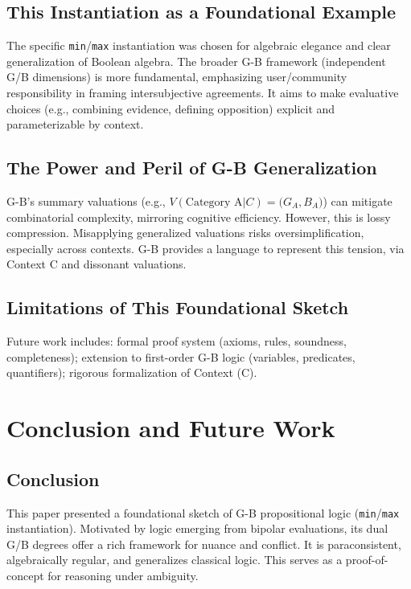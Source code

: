 \documentclass[11pt]{article}
\newcommand{\GB}[2]{\bigl(#1,#2\bigr)} %
\theoremstyle{remark}
\begin{document}
\subsection{This Instantiation as a Foundational Example}
The specific \texttt{min}/\texttt{max} instantiation was chosen for algebraic elegance and clear generalization of Boolean algebra. The broader G-B framework (independent G/B dimensions) is more fundamental, emphasizing user/community responsibility in framing intersubjective agreements. It aims to make evaluative choices (e.g., combining evidence, defining opposition) explicit and parameterizable by context.

\subsection{The Power and Peril of G-B Generalization}
G-B's summary valuations (e.g., $V(\text{Category A} | C) = \GB{G_A}{B_A}$) can mitigate combinatorial complexity, mirroring cognitive efficiency. However, this is lossy compression. Misapplying generalized valuations risks oversimplification, especially across contexts. G-B provides a language to represent this tension, via Context C and dissonant valuations.

\subsection{Limitations of This Foundational Sketch}
Future work includes: formal proof system (axioms, rules, soundness, completeness); extension to first-order G-B logic (variables, predicates, quantifiers); rigorous formalization of Context (C).

\section{Conclusion and Future Work}

\subsection{Conclusion}
This paper presented a foundational sketch of G-B propositional logic (\texttt{min}/\texttt{max} instantiation). Motivated by logic emerging from bipolar evaluations, its dual G/B degrees offer a rich framework for nuance and conflict. It is paraconsistent, algebraically regular, and generalizes classical logic. This serves as a proof-of-concept for reasoning under ambiguity.
\end{document}
